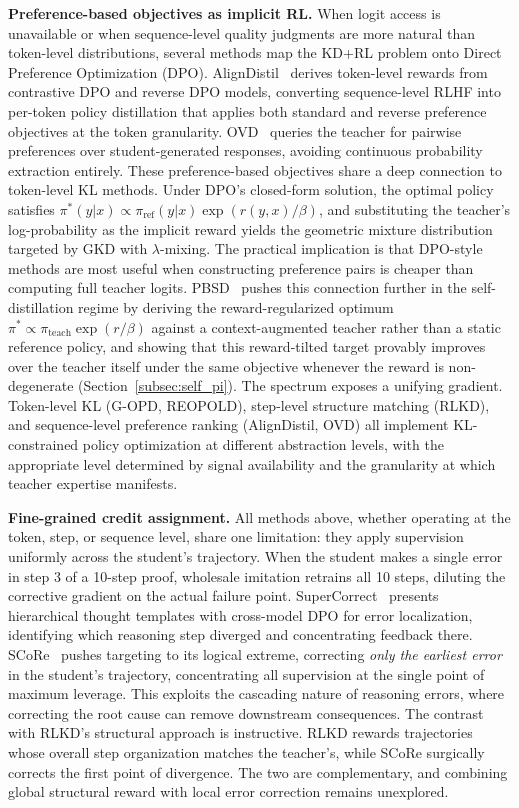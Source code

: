 \documentclass{article} %
\begin{document}
\textbf{Preference-based objectives as implicit RL.} When logit access is unavailable or when sequence-level quality judgments are more natural than token-level distributions, several methods map the KD+RL problem onto Direct Preference Optimization (DPO). AlignDistil~\citep{2503.02832} derives token-level rewards from contrastive DPO and reverse DPO models, converting sequence-level RLHF into per-token policy distillation that applies both standard and reverse preference objectives at the token granularity. OVD~\citep{2601.21968} queries the teacher for pairwise preferences over student-generated responses, avoiding continuous probability extraction entirely. These preference-based objectives share a deep connection to token-level KL methods. Under DPO's closed-form solution, the optimal policy satisfies $\pi^*(y|x) \propto \pi_{\text{ref}}(y|x) \exp(r(y,x)/\beta)$, and substituting the teacher's log-probability as the implicit reward yields the geometric mixture distribution targeted by GKD with $\lambda$-mixing. The practical implication is that DPO-style methods are most useful when constructing preference pairs is cheaper than computing full teacher logits. PBSD~\citep{pbsd2026} pushes this connection further in the self-distillation regime by deriving the reward-regularized optimum $\pi^* \propto \pi_{\text{teach}} \exp(r/\beta)$ against a context-augmented teacher rather than a static reference policy, and showing that this reward-tilted target provably improves over the teacher itself under the same objective whenever the reward is non-degenerate (Section~\ref{subsec:self_pi}). The spectrum exposes a unifying gradient. Token-level KL (G-OPD, REOPOLD), step-level structure matching (RLKD), and sequence-level preference ranking (AlignDistil, OVD) all implement KL-constrained policy optimization at different abstraction levels, with the appropriate level determined by signal availability and the granularity at which teacher expertise manifests.

\textbf{Fine-grained credit assignment.} All methods above, whether operating at the token, step, or sequence level, share one limitation: they apply supervision uniformly across the student's trajectory. When the student makes a single error in step 3 of a 10-step proof, wholesale imitation retrains all 10 steps, diluting the corrective gradient on the actual failure point. SuperCorrect~\citep{2410.09008} presents hierarchical thought templates with cross-model DPO for error localization, identifying which reasoning step diverged and concentrating feedback there. SCoRe~\citep{2509.14257} pushes targeting to its logical extreme, correcting \emph{only the earliest error} in the student's trajectory, concentrating all supervision at the single point of maximum leverage. This exploits the cascading nature of reasoning errors, where correcting the root cause can remove downstream consequences. The contrast with RLKD's structural approach is instructive. RLKD rewards trajectories whose overall step organization matches the teacher's, while SCoRe surgically corrects the first point of divergence. The two are complementary, and combining global structural reward with local error correction remains unexplored.
\end{document}
